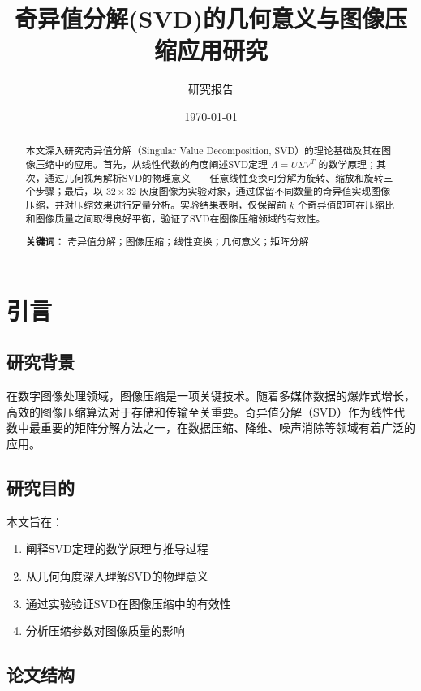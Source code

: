 \documentclass[12pt,a4paper]{article}
\title{奇异值分解(SVD)的几何意义与图像压缩应用研究}
\author{研究报告}
\date{\today}
\begin{document}
\maketitle

\begin{abstract}
本文深入研究奇异值分解（Singular Value Decomposition, SVD）的理论基础及其在图像压缩中的应用。首先，从线性代数的角度阐述SVD定理 $A = U\Sigma V^T$ 的数学原理；其次，通过几何视角解析SVD的物理意义——任意线性变换可分解为旋转、缩放和旋转三个步骤；最后，以 $32 \times 32$ 灰度图像为实验对象，通过保留不同数量的奇异值实现图像压缩，并对压缩效果进行定量分析。实验结果表明，仅保留前 $k$ 个奇异值即可在压缩比和图像质量之间取得良好平衡，验证了SVD在图像压缩领域的有效性。

\textbf{关键词：} 奇异值分解；图像压缩；线性变换；几何意义；矩阵分解
\end{abstract}

\newpage
\tableofcontents
\newpage

\section{引言}

\subsection{研究背景}

在数字图像处理领域，图像压缩是一项关键技术。随着多媒体数据的爆炸式增长，高效的图像压缩算法对于存储和传输至关重要。奇异值分解（SVD）作为线性代数中最重要的矩阵分解方法之一，在数据压缩、降维、噪声消除等领域有着广泛的应用。

\subsection{研究目的}

本文旨在：
\begin{enumerate}[label=(\arabic*)]
    \item 阐释SVD定理的数学原理与推导过程
    \item 从几何角度深入理解SVD的物理意义
    \item 通过实验验证SVD在图像压缩中的有效性
    \item 分析压缩参数对图像质量的影响
\end{enumerate}

\subsection{论文结构}
\end{document}
